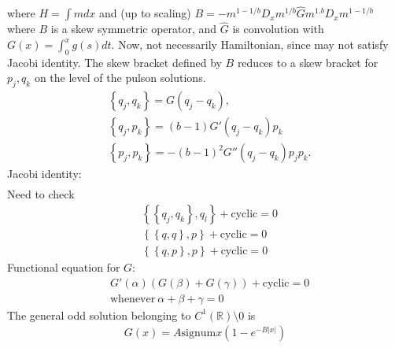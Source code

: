 \documentclass[12pt,reqno]{amsart}
\numberwithin{equation}{section}  %
\newcommand{\rr}{\mathbb{R}}
\newcommand{\wh}{\widehat}
\begin{document}
%
%
  where $H = \int m dx$ and (up to scaling)
  $B = -m^{1 - 1/b} D_{x} m^{1/b} \wh{G} m^{1.b}
  D_{x} m^{1 - 1/b}$ where $B$ is a skew symmetric operator, and $\wh{G}$ is
  convolution with $G(x) = \int_{0}^{x} g(s) dt$. 
  Now, not necessarily Hamiltonian, since may not satisfy Jacobi identity.        
  The skew bracket defined by $B$ reduces to a skew bracket for $p_{j},
  q_{k}$ on the level of the pulson solutions.
%
%
  \begin{equation*}
    \begin{split}
      & \left\{ q_{j}, q_{k} \right\} = G(q_{j} - q_{k}),
      \\
      & \left\{ q_{j}, p_{k} \right\} = (b-1) G'(q_{j} - q_{k})p_{k}
      \\
      & \left\{ p_{j}, p_{k} \right\} = -(b-1)^{2} G''(q_{j} - q_{k})p_{j}
      p_{k}.
    \end{split}
  \end{equation*}
%
%
  Jacobi identity:
%
%
  \begin{equation*}
    \begin{split}
    \end{split}
  \end{equation*}
%
%
  Need to check 
%
%
  \begin{equation*}
    \begin{split}
      & \left\{ \left\{ q_{j}, q_{k} \right\}, q_{l} \right\} + \text{cyclic} = 0
      \\
      & \left\{ \left\{ q, q \right\}, p \right\} + \text{cyclic} = 0
      \\
      & \left\{ \left\{ q, p \right\}, p \right\} + \text{cyclic} = 0
    \end{split}
  \end{equation*}
%
%
  Functional equation for $G$:
%
%
  \begin{equation*}
    \begin{split}
      & G'(\alpha)(G(\beta) + G(\gamma)) + \text{cyclic} = 0
      \\
      &  \text{whenever} \ \alpha + \beta + \gamma =0
    \end{split}
  \end{equation*}
%
%
  The general odd solution belonging to $C^{1}(\rr)\setminus 0$ is
%
%
  \begin{equation*}
    \begin{split}
      G(x) = A \text{signum} x(1 - e^{-B| x |})
    \end{split}
  \end{equation*}
\end{document}
